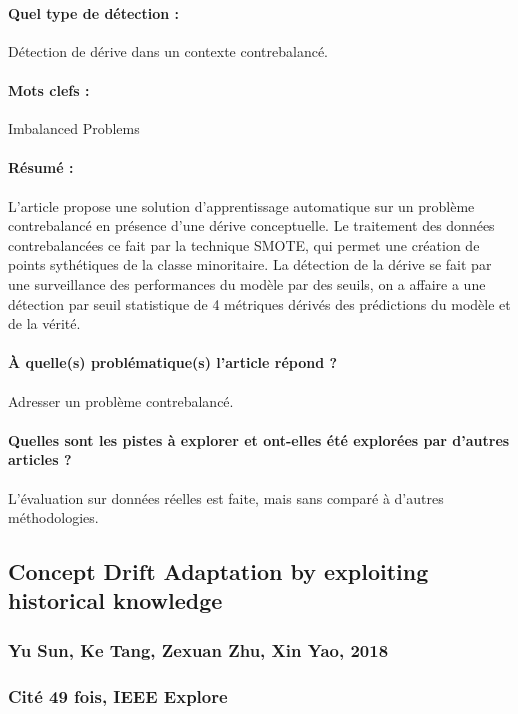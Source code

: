 \documentclass[11pt,a4paper]{report}
\begin{document}
\paragraph{Quel type de détection :} Détection de dérive dans un  contexte contrebalancé.

\paragraph{Mots clefs :} Imbalanced Problems

\paragraph{Résumé :} L'article propose une solution d'apprentissage automatique sur un problème contrebalancé en présence d'une dérive conceptuelle. Le traitement des données contrebalancées ce fait par la technique SMOTE, qui permet une création de points sythétiques de la classe minoritaire. La détection de la dérive se fait par une surveillance des performances du modèle par des seuils, on a affaire a une détection par seuil statistique de 4 métriques dérivés des prédictions du modèle et de la vérité.

\paragraph{À quelle(s) problématique(s) l'article répond ?} Adresser un problème contrebalancé.

\paragraph{Quelles sont les pistes à explorer et ont-elles  été explorées par d'autres articles ?} L'évaluation sur données réelles est faite, mais sans comparé à d'autres méthodologies.






\subsection{Concept Drift Adaptation by exploiting historical knowledge}
\subsubsection{Yu Sun, Ke Tang, Zexuan Zhu, Xin Yao, 2018}

\subsubsection{Cité 49 fois, IEEE Explore}
\end{document}
